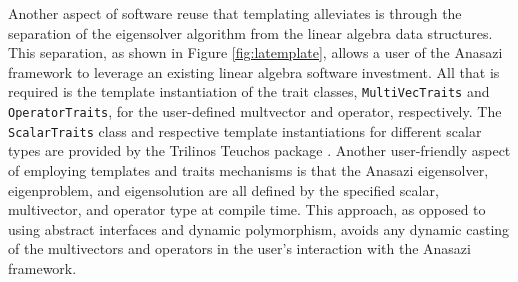 \documentclass[acmtoms]{acmtrans2m}
\newcounter{algorithm}
\newcommand{\aspace}[1]{\texttt{#1}}
\begin{document}
Another aspect of software reuse that templating alleviates is through the separation of the
eigensolver algorithm from the linear algebra data structures.  This separation, as shown in
Figure \ref{fig:latemplate}, allows a user of the Anasazi framework to leverage an existing 
linear algebra software investment.  All that is required is the template instantiation of the trait
classes, \aspace{MultiVecTraits} and \aspace{OperatorTraits}, for the user-defined multvector 
and operator, respectively.  The \aspace{ScalarTraits} class and respective template 
instantiations for different scalar types are provided by the Trilinos Teuchos package 
\cite{Trilinos:Teuchos}. Another user-friendly aspect of employing templates and traits mechanisms
is that the Anasazi eigensolver, eigenproblem, and eigensolution are all defined by the 
specified scalar, multivector, and operator type at compile time.  This approach, as opposed to
using abstract interfaces and dynamic polymorphism, avoids any dynamic casting of the multivectors 
and operators in the user's interaction with the Anasazi framework.


\end{document}
